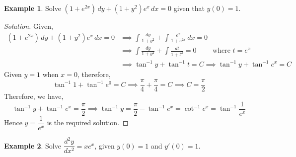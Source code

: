 \documentclass{book}
\theoremstyle{definition}
\newtheorem{example}{Example}[section]
\newenvironment{solution}
    {\begin{proof}[Solution]}
    {\end{proof}}
\begin{document}
\begin{example}
Solve $(1+e^{2x})\,dy+(1+y^2)e^x\,dx=0$ given that $y(0)=1$.
\end{example}

\begin{solution}
Given,
\begin{align*}
(1+e^{2x})\,dy+(1+y^2)e^x\,dx=0 &\implies \int \frac{dy}{1+y^2}  + \int\frac{e^x}{1+e^{2x}}\,dx=0 \\ 
&\implies \int \frac{dy}{1+y^2}  + \displaystyle\int\frac{dt}{1+t^2}=0 \qquad \text{ where $t=e^x$} \\
&\implies \tan^{-1}y+\tan^{-1}t=C \implies \tan^{-1}y+\tan^{-1}e^x=C
\end{align*}
Given $y=1 \text{ when } x=0$, therefore,
\[
\tan^{-1}1+\tan^{-1}e^0=C \implies \frac{\pi}{4}+\frac{\pi}{4}=C \implies C=\frac{\pi}{2}
\]
Therefore, we have, 
\[
\tan^{-1}y+\tan^{-1}e^x=\frac{\pi}{2} \implies \tan^{-1}y=\frac{\pi}{2}-\tan^{-1}e^x=\cot^{-1}e^x=\tan^{-1}\frac{1}{e^x}
\]
Hence $y=\dfrac{1}{e^x}$ is the required solution.
\end{solution}

\begin{example}
Solve $\dfrac{d^2y}{dx^2}=xe^x$, given $y(0)=1$ and $y'(0)=1$.    
\end{example}
\end{document}
